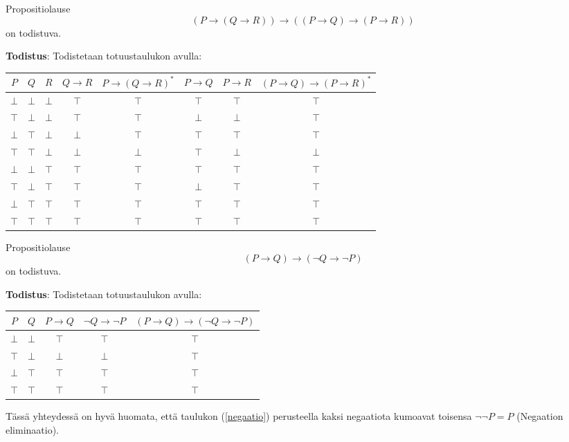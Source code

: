 \documentclass[a4paper,12pt]{amsart}
\begin{document}
\begin{lause}\label{as}
Propositiolause
$$
(P\to(Q\to R))\to((P\to Q)\to(P \to R))
$$
on todistuva.

{\bf Todistus}: Todistetaan totuustaulukon avulla:

\begin{tabular}{c|c|c|c|c|c|c|c}
$P$ & $Q$ & $R$ & $Q\to R$ & $P\to(Q\to R)^*$ & $P\to Q$ & $P\to R$ & $(P\to Q)\to(P \to R)^*$ \\
\hline
\hline
$\bot$ & $\bot$ & $\bot$ & $\top$ & $\top$ & $\top$ & $\top$ & $\top$ \\
\hline
$\top$ & $\bot$ & $\bot$ & $\top$ & $\top$ & $\bot$ & $\bot$ & $\top$ \\
\hline
$\bot$ & $\top$ & $\bot$ & $\bot$ & $\top$ & $\top$ & $\top$ & $\top$ \\
\hline
$\top$ & $\top$ & $\bot$ & $\bot$ & $\bot$ & $\top$ & $\bot$ & $\bot$ \\
\hline
$\bot$ & $\bot$ & $\top$ & $\top$ & $\top$ & $\top$ & $\top$ & $\top$ \\
\hline
$\top$ & $\bot$ & $\top$ & $\top$ & $\top$ & $\bot$ & $\top$ & $\top$ \\
\hline
$\bot$ & $\top$ & $\top$ & $\top$ & $\top$ & $\top$ & $\top$ & $\top$ \\
\hline
$\top$ & $\top$ & $\top$ & $\top$ & $\top$ & $\top$ & $\top$ & $\top$ \\
\hline
\end{tabular}
\end{lause}
\begin{lause}\label{mt}
Propositiolause
$$
(P\to Q)\to(\lnot Q\to\lnot P)
$$
on todistuva.

{\bf Todistus}: Todistetaan totuustaulukon avulla:

\begin{tabular}{c|c|c|c|c}
$P$ & $Q$ & $P\to Q$ & $\lnot Q\to\lnot P$ & $(P\to Q)\to(\lnot Q\to\lnot P)$ \\
\hline
\hline
$\bot$ & $\bot$ & $\top$ & $\top$ & $\top$ \\
\hline
$\top$ & $\bot$ & $\bot$ & $\bot$ & $\top$ \\
\hline
$\bot$ & $\top$ & $\top$ & $\top$ & $\top$ \\
\hline
$\top$ & $\top$ & $\top$ & $\top$ & $\top$ \\
\hline
\end{tabular}
\end{lause}
Tässä yhteydessä on hyvä huomata, että taulukon (\ref{negaatio}) perusteella kaksi negaatiota kumoavat toisensa $\lnot\lnot P=P$ (Negaation eliminaatio).
\end{document}
